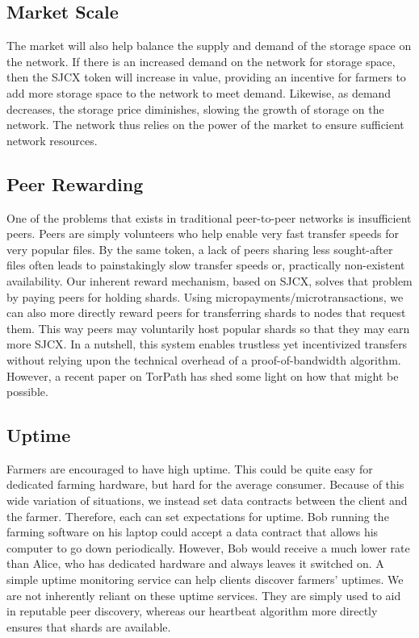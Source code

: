 \documentclass[a4paper,10pt]{article}
\begin{document}
\subsection{Market Scale}
The market will also help balance the supply and demand of the storage space on the network. If there is an increased demand on the network for storage space, then the SJCX token will increase in value, providing an incentive for farmers to add more storage space to the network to meet demand. Likewise, as demand decreases, the storage price diminishes, slowing the growth of storage on the network. The network thus relies on the power of the market to ensure sufficient network resources. 

\subsection{Peer Rewarding}
One of the problems that exists in traditional peer-to-peer networks is insufficient peers. Peers are simply volunteers who help enable very fast transfer speeds for very popular files. By the same token, a lack of peers sharing less sought-after files often leads to painstakingly slow transfer speeds or, practically non-existent availability. Our inherent reward mechanism, based on SJCX, solves that problem by paying peers for holding shards. Using micropayments/microtransactions, we can also more directly reward peers for transferring shards to nodes that request them. This way peers may voluntarily host popular shards so that they may earn more SJCX. In a nutshell, this system enables trustless yet incentivized transfers without relying upon the technical overhead of a proof-of-bandwidth algorithm. However, a recent paper on TorPath \cite{14} has shed some light on how that might be possible. 

\subsection{Uptime}
Farmers are encouraged to have high uptime. This could be quite easy for dedicated farming hardware, but hard for the average consumer. Because of this wide variation of situations, we instead set data contracts between the client and the farmer. Therefore, each can set expectations for uptime. Bob running the farming software on his laptop could accept a data contract that allows his computer to go down periodically. However, Bob would receive a much lower rate than Alice, who has dedicated hardware and always leaves it switched on. A simple uptime monitoring service can help clients discover farmers’ uptimes. We are not inherently reliant on these uptime services. They are simply used to aid in reputable peer discovery, whereas our heartbeat algorithm more directly ensures that shards are available.
\end{document}
